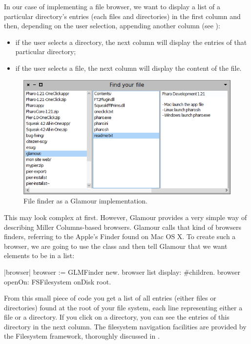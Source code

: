 \documentclass[a4paper,10pt,twoside]{book}
\begin{document}
In our case of implementing a file browser, we want to display a list
of a particular directory's entries (each files and directories) in
the first column and then, depending on the user selection, appending
another column (see ):

\begin{itemize}
\item if the user selects a directory, the next column will display
  the entries of that particular directory;
\item if the user selects a file, the next column will display the
  content of the file.
\end{itemize}

\begin{figure}
  \begin{center}
    \includegraphics[scale=0.48]{cs_file_finder_final}
    \caption{File finder as a Glamour
      implementation. \label{fig:casestudies/file_finder}}
  \end{center}
\end{figure}

This may look complex at first. However, Glamour provides a very
simple way of describing Miller Columns-based browsers. Glamour calls
that kind of browsers finders, referring to the Apple's Finder found
on Mac OS X. To create such a browser, we are going to use the
 class and then tell Glamour that we want elements
to be in a list:

\begin{code}{}
|browser|
browser := GLMFinder new.
browser list
	display: #children.
browser openOn: FSFilesystem onDisk root.
\end{code}

From this small piece of code you get a list of all entries (either
files or directories) found at the root of your file system, each line
representing either a file or a directory. If you click on a
directory, you can see the entries of this directory in the next
column. The filesystem navigation facilities are provided by the
Filesystem framework, thoroughly discussed in .
\end{document}

